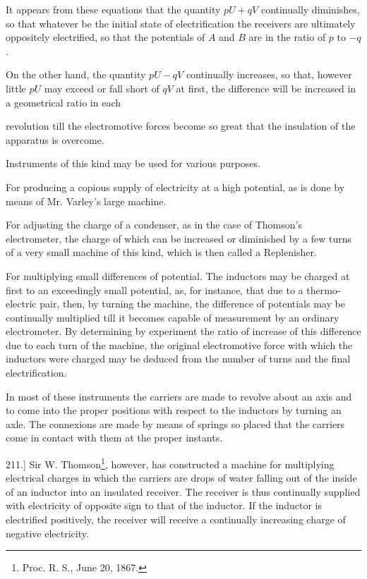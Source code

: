 \documentclass[11pt,a4paper]{article}
\begin{document}
It appears from these equations that the quantity $pU+qV$ continually
diminishes, so that whatever be the initial state of electrification the
receivers are ultimately oppositely electrified, so that the potentials
of $A$ and $B$ are in the ratio of $p$ to $-q$.

On the other hand, the quantity $pU-qV$ continually increases, so that,
however little $pU$ may exceed or fall short of $qV$ at first, the
difference will be increased in a geometrical ratio in each

\setcounter{footnote}{0}
revolution till the electromotive forces become so great that the
insulation of the apparatus is overcome.

Instruments of this kind may be used for various purposes.

For producing a copious supply of electricity at a high potential, as is
done by means of Mr. Varley's large machine.

For adjusting the charge of a condenser, as in the case of Thomson's
electrometer, the charge of which can be increased or diminished by a few
turns of a very small machine of this kind, which is then called a
Replenisher.

For multiplying small differences of potential. The inductors may be
charged at first to an exceedingly small potential, as, for instance,
that due to a thermo-electric pair, then, by turning the machine, the
difference of potentials may be continually multiplied till it becomes
capable of measurement by an ordinary electrometer. By determining by
experiment the ratio of increase of this difference due to each turn of
the machine, the original electromotive force with which the inductors
were charged may be deduced from the number of turns and the final
electrification.

In most of these instruments the carriers are made to revolve about an
axis and to come into the proper positions with respect to the inductors
by turning an axle. The connexions are made by means of springs so placed
that the carriers come in contact with them at the proper instants.

211.] Sir W. Thomson\setcounter{footnote}{0}\footnote{Proc. R. S., June
20, 1867.}, however, has constructed a machine for multiplying electrical
charges in which the carriers are drops of water falling out of the
inside of an inductor into an insulated receiver. The receiver is thus
continually supplied with electricity of opposite sign to that of the
inductor. If the inductor is electrified positively, the receiver will
receive a continually increasing charge of negative electricity.
\end{document}

